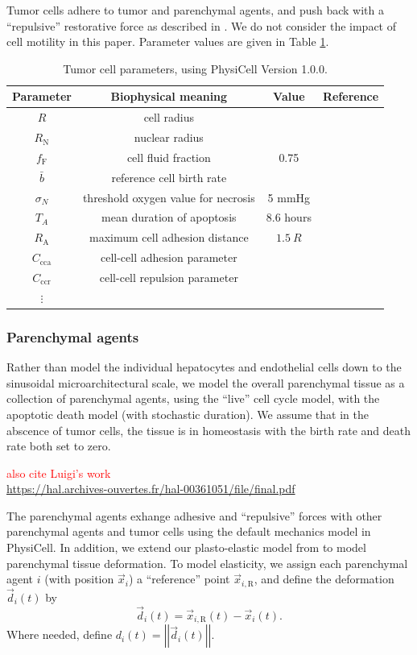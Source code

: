 \documentclass[smallextended,natbib,draft]{svjour3}
\newcommand{\beq}{\begin{equation}}
\newcommand{\eeq}{\end{equation}}
\newcommand{\norm}[1]{\left|\left|#1\right|\right|}
\newcommand{\red}[1]{\textcolor{red}{#1}}
\begin{document}
Tumor cells adhere to tumor and parenchymal agents, and push back 
with a ``repulsive'' restorative force as described in \citet{physicell}. 
We do not consider the impact of cell motility in this paper. 
Parameter values are given in Table \ref{tab:tumor_physicell_parameters}. 


\begin{table}
\begin{tabular}{cccc}
\textbf{Parameter} & \textbf{Biophysical meaning} & \textbf{Value} & \textbf{Reference}\\
\hline 
$R$ & cell radius & \\
$R_\mathrm{N}$ & nuclear radius & \\
$f_\mathrm{F}$ & cell fluid fraction & 0.75 \\
$\bar{b}$ & reference cell birth rate &  \\
$\sigma_N$ & threshold oxygen value for necrosis & 5 mmHg & \\
$T_A$ & mean duration of apoptosis & 8.6 hours & \\
$R_\mathrm{A}$ & maximum cell adhesion distance & $ 1.5 \: R$ \\
$C_\mathrm{cca}$ & cell-cell adhesion parameter &  \\
$C_\mathrm{ccr}$ & cell-cell repulsion parameter & \\
$\vdots$
\end{tabular}
\caption{Tumor cell parameters, using PhysiCell Version 1.0.0.}
\label{tab:tumor_physicell_parameters}
\end{table}

\subsubsection{Parenchymal agents}
\label{sec:parenchyme_agent_model}
Rather than model the individual hepatocytes and endothelial cells down to the 
sinusoidal microarchitectural scale, we model the overall parenchymal tissue 
as a collection of parenchymal agents, using the ``live'' cell cycle model, 
with the apoptotic death model (with stochastic duration). We assume that in 
the abscence of tumor cells, the tissue is in homeostasis with the birth rate 
and death rate both set to zero. 

\red{also cite Luigi's work}\\
\url{https://hal.archives-ouvertes.fr/hal-00361051/file/final.pdf}

The parenchymal agents exhange adhesive and ``repulsive'' forces with 
other parenchymal agents and tumor cells using the default mechanics 
model in PhysiCell. In addition, we extend our plasto-elastic model 
from \citet{dantonio13_mbe} to model parenchymal tissue deformation. To model 
elasticity, we assign each parenchymal agent $i$ 
(with position $\vec{x}_i$) a ``reference'' point $\vec{x}_{i,\mathrm{R}}$, 
and define the deformation $\vec{d}_i(t)$ by 
\beq
\vec{d}_i(t) = \vec{x}_{i,\mathrm{R}}(t) - \vec{x}_i(t).
\eeq
Where needed, define $d_i(t) = \norm{ \vec{d}_i(t) }$. 
\end{document}
